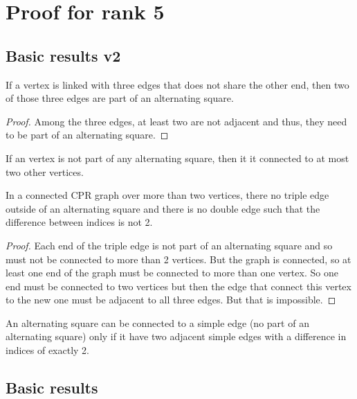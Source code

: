 \chapter{Proof for rank 5}

\section{Basic results v2}

\begin{proposition}
  If a vertex is linked with three edges that does not share the other end, then two of those three edges are part of an alternating square.
\end{proposition}

\begin{proof}
  Among the three edges, at least two are not adjacent and thus, they need to be part of an alternating square.
\end{proof}

\begin{corollary}
  If an vertex is not part of any alternating square, then it it connected to at most two other vertices.
\end{corollary}

\begin{proposition}
  In a connected CPR graph over more than two vertices, there no triple edge outside of an alternating square and there is no double edge such that the difference between indices is not 2.
\end{proposition}

\begin{proof}
  Each end of the triple edge is not part of an alternating square and so must not be connected to more than 2 vertices. But the graph is connected, so at least one end of the graph must be connected to more than one vertex. So one end must be connected to two vertices but then the edge that connect this vertex to the new one must be adjacent to all three edges. But that is impossible.
\end{proof}

\begin{proposition}
  An alternating square can be connected to a simple edge (no part of an alternating square) only if it have two adjacent simple edges with a difference in indices of exactly 2.
\end{proposition}



\section{Basic results}

